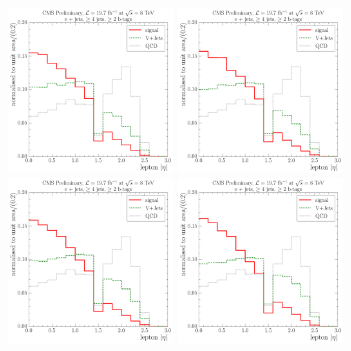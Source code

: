 \begin{figure}[!htbp]
  \centering
    \vspace*{-0.5cm}
    \hspace*{\fill}
    {\includegraphics[width=0.39\textwidth]{measurement/MT/central/fit_templates/electron_templates_bin_0-30}}\hfill
    {\includegraphics[width=0.39\textwidth]{measurement/MT/central/fit_templates/electron_templates_bin_30-50}}
    \hspace*{\fill} \\
    \hspace*{\fill}
    {\includegraphics[width=0.39\textwidth]{measurement/MT/central/fit_templates/electron_templates_bin_50-80}}\hfill
    {\includegraphics[width=0.39\textwidth]{measurement/MT/central/fit_templates/electron_templates_bin_80-100}}

\end{figure}
